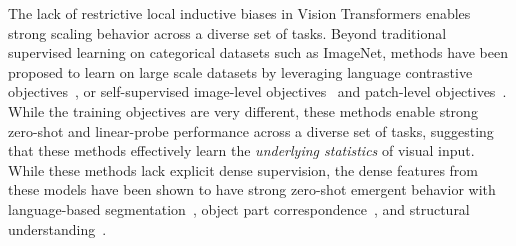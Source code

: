  The lack of restrictive local inductive biases in Vision Transformers enables strong scaling behavior across a diverse set of tasks. Beyond traditional supervised learning on categorical datasets such as ImageNet, methods have been proposed to learn on large scale datasets by leveraging language contrastive objectives~\citep{Radford2021LearningTV,yu2022coca}, or self-supervised image-level objectives~\citep{caron2021emerging,chen2021mocov3,li2021esvit} and patch-level objectives~\citep{trinh2019selfieselfsupervisedpretrainingimage,pmlr-v119-chen20s,xie2021simmim,MaskedAutoencoders2021,zhou2021ibot,bao2022beit,assran2023self,oquab2023dinov2}. While the training objectives are very different, these methods enable strong zero-shot and linear-probe performance across a diverse set of tasks, suggesting that these methods effectively learn the \emph{underlying statistics} of visual input. While these methods lack explicit dense supervision, the dense features from these models have been shown to have strong zero-shot emergent behavior with language-based segmentation~\cite{zhou2022extract}, object part correspondence~\citep{amir2021deep}, and structural understanding~\citep{Ranzinger_2024_CVPR}.

